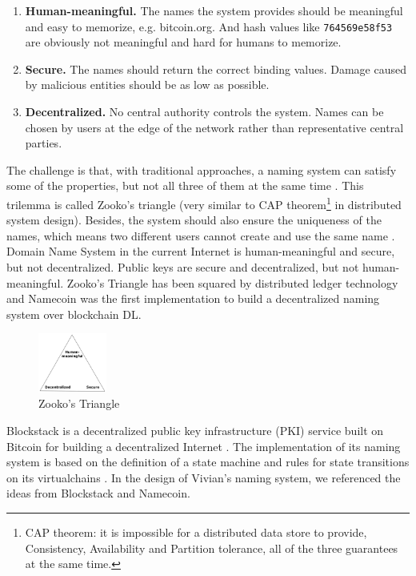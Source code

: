 \begin{enumerate}
    \item \textbf{Human-meaningful.} The names the system provides should be meaningful and easy to memorize, e.g. bitcoin.org. And hash values like \texttt{764569e58f53} are obviously not meaningful and hard for humans to memorize.
    \item \textbf{Secure.} The names should return the correct binding values. Damage caused by malicious entities should be as low  as possible.
    \item \textbf{Decentralized.} No central authority controls the system. Names can be chosen by users at the edge of the network rather than representative central parties.
\end{enumerate}

The challenge is that, with traditional approaches, a naming system can satisfy some of the properties, but not all three of them at the same time \cite{wilcox2001names}. This trilemma is called Zooko's triangle \cite{swartz_2011} (very similar to CAP theorem\footnote{CAP theorem: it is impossible for a distributed data store to provide, Consistency, Availability and Partition tolerance, all of the three guarantees at the same time.} in distributed system design).
Besides, the system should also ensure the uniqueness of the names, which means two different users cannot create and use the same name \cite{ali2017blockstack}.
Domain Name System in the current Internet is human-meaningful and secure, but not decentralized. Public keys are secure and decentralized, but not human-meaningful.
Zooko's Triangle has been squared by distributed ledger technology \cite{swartz_2011} and Namecoin was the first implementation to build a decentralized naming system over blockchain DL.

\begin{figure}[h]
    \centering
    \includegraphics[width=0.2\textwidth,trim={0 0 0 0},clip]{figs/zooko_triangle.png}
    \caption{Zooko's Triangle}
    \label{fig:zooko_triangle}
\end{figure}

Blockstack is a decentralized public key infrastructure (PKI) service built on Bitcoin for building a decentralized Internet \cite{ali2017blockstack}.
The implementation of its naming system is based on the definition of a state machine and rules for state transitions on its virtualchains \cite{nelson2016extending, ali2016blockstack}.
In the design of Vivian's naming system, we referenced the ideas from Blockstack and Namecoin. 

